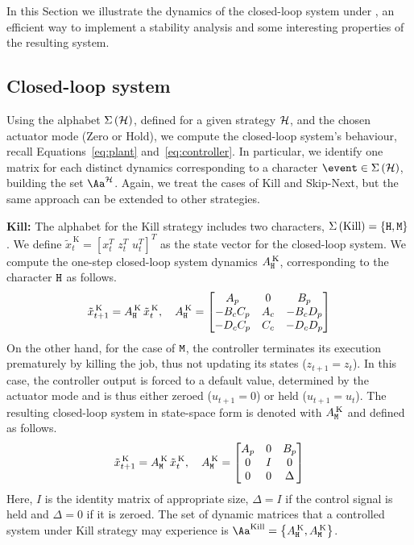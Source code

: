 In this Section we illustrate the dynamics of the closed-loop system under \ewhc{}, an efficient way to implement a stability analysis and some interesting properties of the resulting system.

\subsection{Closed-loop system}%
\label{sec:matrices}

Using the alphabet $\Sigma\left(\mathcal{H}\right)$, defined for a given strategy $\mathcal{H}$, and the chosen actuator mode (Zero or Hold), we compute the closed-loop system's behaviour, recall Equations~\eqref{eq:plant} and~\eqref{eq:controller}.
In particular, we identify one matrix for each distinct dynamics corresponding to a character $\event \in \Sigma\left( \strat \right)$, building the set $\Aa^\strat$.
Again, we treat the cases of Kill and Skip-Next, but the same approach can be extended to other strategies.

\textbf{Kill: }%
%
The alphabet for the Kill strategy includes two characters, $\Sigma\left(\text{Kill}\right) = \{ \texttt{H}, \texttt{M} \}$. We define $\tilde x_t^{\,\text{K}} = \left[ x_t^T\,\, z_t^T\,\, u_t^T \right]^T$ as the state vector for the closed-loop system.
We compute the one-step closed-loop system dynamics $A^{\,\text{K}}_{\texttt{H}}$, corresponding to the character $\texttt{H}$ as follows.
\begin{equation*}
    \tilde x_{t+1}^{\,\text{K}} = A^{\,\text{K}}_{\texttt{H}}\,\tilde x_t^{\,\text{K}}, \quad
     A^{\,\text{K}}_{\texttt{H}} = \begin{bmatrix}
        A_p       & 0    & B_p       \\
        -B_cC_p   & A_c  & -B_cD_p   \\
        -D_cC_p   & C_c  & -D_cD_p   \\
    \end{bmatrix}
\end{equation*}
%
On the other hand, for the case of $\texttt{M}$, the controller terminates its execution prematurely by killing the job, thus not updating its states ($z_{t+1} = z_t$).
In this case, the controller output is forced to a default value, determined by the actuator mode and is thus either zeroed ($u_{t+1} = 0$) or held ($u_{t+1} = u_t$).
The resulting closed-loop system in state-space form is denoted with $A^{\,\text{K}}_{\texttt{M}}$ and defined as follows.
\begin{equation*}
    \tilde x_{t+1}^{\,\text{K}} = A^{\,\text{K}}_{\texttt{M}}\,\tilde x_t^{\,\text{K}}, \quad
    A^{\,\text{K}}_{\texttt{M}} = \begin{bmatrix}
        A_p & 0  & B_p \\
        0   & I  & 0   \\
        0   & 0  & \Delta
    \end{bmatrix}
\end{equation*}
Here, $I$ is the identity matrix of appropriate size, $\Delta = I$ if the control signal is held and $\Delta = 0$ if it is zeroed.
The set of dynamic matrices that a controlled system under Kill strategy may experience is $\Aa^{\text{Kill}}=\left\{A^{\,\text{K}}_{\cH},A^{\,\text{K}}_{\cM}\right\}$.

